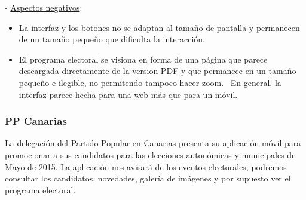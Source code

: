  - \underline{Aspectos negativos}:

\begin{itemize}
	\item La interfaz y los botones no se adaptan al tamaño de pantalla y permanecen de un tamaño pequeño que dificulta la interacción.
	\item El programa electoral se visiona en forma de una página que parece descargada directamente de la version PDF y que permanece en un tamaño pequeño e ilegible, no permitendo tampoco hacer zoom.
	\ En general, la interfaz parece hecha para una web más que para un móvil. 
\end{itemize}

\subsubsection{PP Canarias}

La delegación del Partido Popular en Canarias presenta su aplicación móvil \cite{ref:ppCan} para promocionar a sus candidatos para las elecciones autonómicas y municipales de Mayo de 2015. La aplicación nos avisará de los eventos electorales, podremos consultar los candidatos, novedades, galería de imágenes y por supuesto ver el programa electoral.

